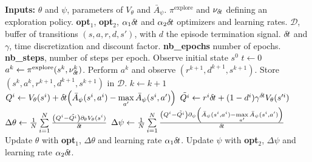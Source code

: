 \begin{algorithmic}
	\STATE \textbf{Inputs:}
	\STATE $\theta$ and $\psi$, parameters of
	$V_{\theta}$ and $\bar{A}_{\psi}$.
	\STATE $\pi^{\text{explore}}$ and $\nu_{\delta\hspace{-.1em}t}$ defining an exploration policy.
	\STATE \textbf{opt}$_1$, \textbf{opt}$_2$, $\alpha_1 {\delta\hspace{-.1em}t}$ and $\alpha_2 {\delta\hspace{-.1em}t}$ optimizers and learning rates.
	\STATE $\mathcal{D}$, buffer of transitions $(s, a, r, d, s')$, with $d$ the episode termination signal.
	\STATE ${\delta\hspace{-.1em}t}$ and $\gamma$, time discretization and discount factor.
	\STATE \textbf{nb\_epochs} number of epochs.
	\STATE \textbf{nb\_steps}, number of steps per epoch.
	\STATE
	\STATE Observe initial state $s^0$
	\STATE $t \gets 0$
	\STATE $a^k \leftarrow \pi^{\text{explore}}(s^k, \nu^k_{\delta\hspace{-.1em}t})$.
	\STATE Perform $a^k$ and observe $(r^{k+1}, d^{k+1}, s^{k+1})$.
	\STATE Store $(s^k, a^k, r^{k+1}, d^{k+1}, s^{k+1})$ in $\mathcal{D}$.
	\STATE $k \gets k + 1$
	\ENDFOR
	\STATE {}
	\STATE $Q^i \gets V_{\theta}(s^i) + {\delta\hspace{-.1em}t}\hspace{-.17em}\left(
	\bar{A}_{\psi}(s^i, a^i) - \max\limits_{a'}\bar{A}_{\psi}(s^i, a')\right)$
	\STATE $\tilde{Q^i} \gets r^i{\delta\hspace{-.1em}t} + (1 - d^i) \gamma^{{\delta\hspace{-.1em}t}} V_{\theta}(s'^i)$
	\STATE $\Delta \theta \gets \frac{1}{N}\sum\limits_{i=1}^N  \frac{\left(Q^i - \tilde{Q^i}\right)\partial_{\theta} V_{\theta}(s^i)}{{\delta\hspace{-.1em}t}}$
	\STATE $\Delta \psi \gets \frac{1}{N}\sum\limits_{i=1}^N \frac{\left(Q^i - \tilde{Q^i}\right)\partial_{\psi} \left(\bar{A}_{\psi}(s^i, a^i) - \max\limits_{a'}\bar{A}_{\psi}(s^i, a')\right) }{{\delta\hspace{-.1em}t}}$
	\STATE Update $\theta$ with \textbf{opt}$_1$, $\Delta \theta$ and learning rate $\alpha_1 {\delta\hspace{-.1em}t}$.
	\STATE Update $\psi$ with \textbf{opt}$_2$, $\Delta \psi$ and learning rate $\alpha_2 {\delta\hspace{-.1em}t}$.
	\ENDFOR
	\ENDFOR
\end{algorithmic}
